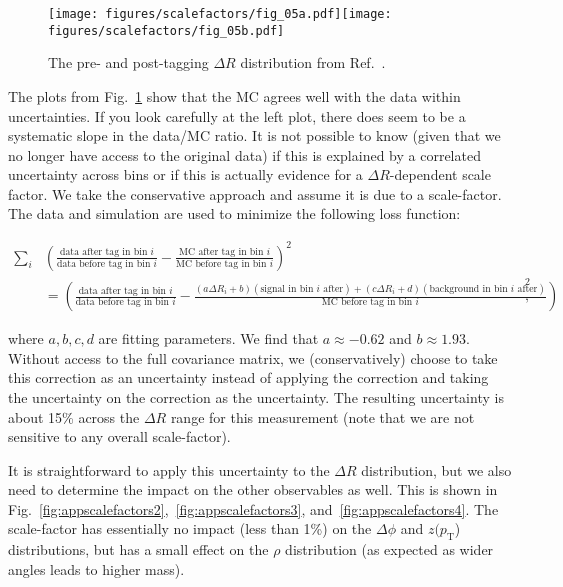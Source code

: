 \documentclass[UKenglish,texlive=2013]{\ATLASLATEXPATH atlasdoc}
\begin{document}
\begin{figure}[htpb!]
\begin{center}
\texttt{[image: figures/scalefactors/fig\_05a.pdf]}\texttt{[image: figures/scalefactors/fig\_05b.pdf]}
\caption[]{The pre- and post-tagging $\Delta R$ distribution from Ref.~\cite{ATLAS-CONF-2016-002}.} 
\label{fig:appscalefactors1}
\end{center}
\end{figure}

The plots from Fig.~\ref{fig:appscalefactors1} show that the MC agrees well with the data within uncertainties.  If you look carefully at the left plot, there does seem to be a systematic slope in the data/MC ratio.  It is not possible to know (given that we no longer have access to the original data) if this is explained by a correlated uncertainty across bins or if this is actually evidence for a $\Delta R$-dependent scale factor.  We take the conservative approach and assume it is due to a scale-factor.  The data and simulation are used to minimize the following loss function:

\begin{align}
\sum_i&\left(\frac{\text{data after tag in bin $i$}}{\text{data before tag in bin $i$}}-\frac{\text{MC after tag in bin $i$}}{\text{MC before tag in bin $i$}}\right)^2\\
&=\left(\frac{\text{data after tag in bin $i$}}{\text{data before tag in bin $i$}}-\frac{(a\Delta R_i+b)(\text{signal in bin $i$ after})+(c\Delta R_i+d)(\text{background in bin $i$ after})}{\text{MC before tag in bin $i$}}\right)^2,
\end{align}

where $a,b,c,d$ are fitting parameters.  We find that $a\approx -0.62$ and $b\approx 1.93$.  Without access to the full covariance matrix, we (conservatively) choose to take this correction as an uncertainty instead of applying the correction and taking the uncertainty on the correction as the uncertainty.   The resulting uncertainty is about 15\% across the $\Delta R$ range for this measurement (note that we are not sensitive to any overall scale-factor).

It is straightforward to apply this uncertainty to the $\Delta R$ distribution, but we also need to determine the impact on the other observables as well.  This is shown in Fig.~\ref{fig:appscalefactors2},~\ref{fig:appscalefactors3}, and~\ref{fig:appscalefactors4}.  The scale-factor has essentially no impact (less than 1\%) on the $\Delta\phi$ and $z(p_\text{T}$) distributions, but has a small effect on the $\rho$ distribution (as expected as wider angles leads to higher mass).
\end{document}
